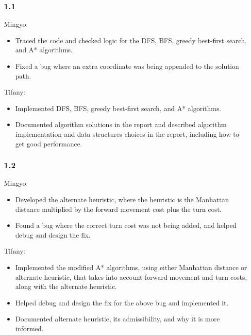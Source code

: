 \subsubsection*{1.1}
Mingyo:
\begin{itemize}[itemsep=0pt]
  \item Traced the code and checked logic for the DFS, BFS, greedy best-first search, and A* algorithms.
  \item Fixed a bug where an extra coordinate was being appended to the solution path.
\end{itemize}
Tifany:
\begin{itemize}[itemsep=0pt]
  \item Implemented DFS, BFS, greedy best-first search, and A* algorithms.
  \item Documented algorithm solutions in the report and described algorithm implementation and data structures choices in the report, including how to get good performance.
\end{itemize}

\subsubsection*{1.2}
Mingyo:
\begin{itemize}[itemsep=0pt]
  \item Developed the alternate heuristic, where the heuristic is the Manhattan distance multiplied by the forward movement cost plus the turn cost.
  \item Found a bug where the correct turn cost was not being added, and helped debug and design the fix.
\end{itemize}
Tifany:
\begin{itemize}[itemsep=0pt]
  \item Implemented the modified A* algorithms, using either Manhattan distance or alternate heuristic, that takes into account forward movement and turn costs, along with the alternate heuristic.
  \item Helped debug and design the fix for the above bug and implemented it.
  \item Documented alternate heuristic, its admissibility, and why it is more informed.
\end{itemize}

